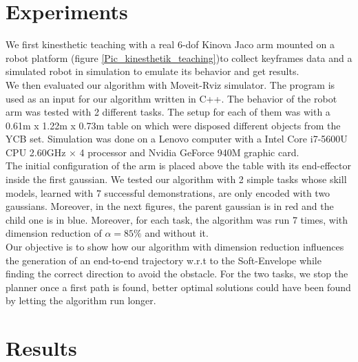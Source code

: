 \documentclass[letterpaper, 10 pt, conference]{ieeeconf}  %
\begin{document}
\section{Experiments}
We first kinesthetic teaching with a real 6-dof Kinova Jaco arm mounted on a robot platform (figure \ref{Pic_kinesthetik_teaching})to collect keyframes data and a simulated robot in simulation to emulate its behavior and get results.\\
We then evaluated our algorithm with Moveit-Rviz simulator. The program is used as an input for our algorithm written in C++. The behavior of the robot arm was tested with 2 different tasks. The setup for each of them was with a 0.61m x 1.22m x 0.73m table on which were disposed different objects from the YCB set. Simulation was done on a Lenovo computer with  a Intel Core i7-5600U CPU 2.60GHz × 4 processor and Nvidia GeForce 940M graphic card.\\
 The initial configuration of the arm is placed above the table with its end-effector inside the first gaussian. We tested our algorithm with 2 simple tasks whose skill models, learned with 7 successful demonstrations, are only encoded with two gaussians.  Moreover, in the next figures, the parent gaussian is in red and the child one is in blue. Moreover, for each task, the algorithm was run 7 times, with dimension reduction of $\alpha = 85 \%$ and without it.\\
  Our objective is to show how our algorithm with dimension reduction influences the generation of an end-to-end trajectory w.r.t to the Soft-Envelope while finding the correct direction to avoid the obstacle. For the two tasks, we stop the planner once a first path is found, better optimal solutions could have been found by letting the algorithm run longer.

\section{Results}
\end{document}
